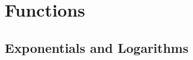 \documentclass[12pt]{report}
\begin{document}
\section*{Functions}

\subsection*{Exponentials and Logarithms}
\end{document}

